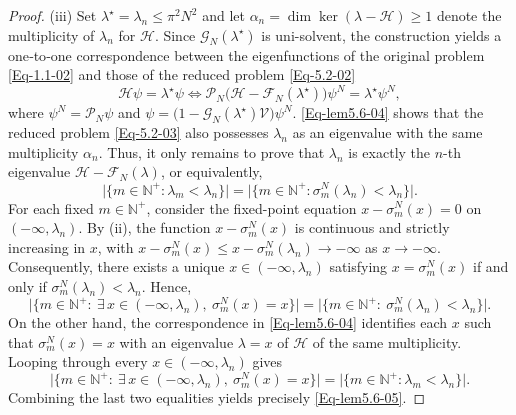 \documentclass{sn-jnl}%
\numberwithin{equation}{section}
\theoremstyle{thmstyleone}%
\theoremstyle{thmstyletwo}%
\theoremstyle{thmstylethree}%
\begin{document}
\begin{appendices}
\begin{proof}
    
    (iii) Set $\lambda^\star = \lambda_n\leq \pi^2N^2$ and let $\alpha_n=\operatorname{dim}\operatorname{ker}(\lambda-\mathcal{H})\geq 1$ denote the multiplicity of $\lambda_n$ for $\mathcal{H}$. Since $\mathcal{G}_N(\lambda^\star)$ is uni-solvent,  the construction yields a one‑to‑one correspondence between the eigenfunctions of the original problem \eqref{Eq-1.1-02} and those of the reduced problem \eqref{Eq-5.2-02}
    \begin{equation} \label{Eq-lem5.6-04}
    \mathcal{H}\psi = \lambda^\star\psi \Longleftrightarrow \mathcal{P}_N\bigl(\mathcal{H}-\mathcal{F}_N(\lambda^\star)\bigr)\psi^N = \lambda^\star\psi^N,
    \end{equation}
    where $\psi^N = \mathcal{P}_N \psi$ and $\psi  = \bigl(1- \mathcal{G}_N(\lambda^\star) \mathcal{V}\bigr)\psi^N$.  \eqref{Eq-lem5.6-04} shows that the reduced problem \eqref{Eq-5.2-03} also possesses $\lambda_n$  as an eigenvalue with the same multiplicity $\alpha_n$. Thus, it only remains to prove that $\lambda_n$ is exactly the $n$-th eigenvalue $\mathcal{H}-\mathcal{F}_N(\lambda)$, or equivalently,  \begin{equation}\label{Eq-lem5.6-05}
    \bigl|\{m\in \mathbb{N}^+:\lambda_m<\lambda_n\}\bigr| = 
    \bigl|\{m\in \mathbb{N}^+:\sigma_m^N(\lambda_n)<\lambda_n\}\bigr|.
    \end{equation}
    For each fixed $m \in \mathbb{N}^+$, consider the fixed-point equation $x-\sigma_m^N(x)=0$ on $(-\infty,\lambda_n)$. By (ii),  the function $x-\sigma_m^N(x)$ is continuous and strictly increasing in $x$, with $x-\sigma_m^N(x)\leq x-\sigma^N_m(\lambda_n) \to -\infty $ as $x \to -\infty$. Consequently, there exists a unique $x\in (-\infty,\lambda_n)$ satisfying $x = \sigma_m^N(x) $ if and only if $\sigma_m^N(\lambda_n)<\lambda_n$. Hence,
    \begin{equation}
        \bigl|\{ m\in \mathbb N^{+} :\ \exists\, x\in(-\infty,\lambda_n),\ \sigma_m^N(x)=x\}\bigr| =
        \bigl|\{ m\in \mathbb N^{+} :\ \sigma_m^N(\lambda_n)<\lambda_n\}\bigr|.
    \end{equation}
    On the other hand, the correspondence in \eqref{Eq-lem5.6-04} identifies each $x$ such that $\sigma_m^N(x) = x$ with an eigenvalue $\lambda = x$ of $\mathcal{H}$ of the same multiplicity. Looping through every $x \in (-\infty, \lambda_n)$ gives
    \begin{equation}
       \bigl|\{ m\in \mathbb N^{+} :\ \exists\, x\in(-\infty,\lambda_n),\ \sigma_m^N(x)=x\}\bigr| = \bigl|\{m\in \mathbb{N}^+:\lambda_m<\lambda_n\}\bigr|.
    \end{equation}
    Combining the last two equalities yields precisely \eqref{Eq-lem5.6-05}.
\end{proof}


\end{appendices}
\end{document}

